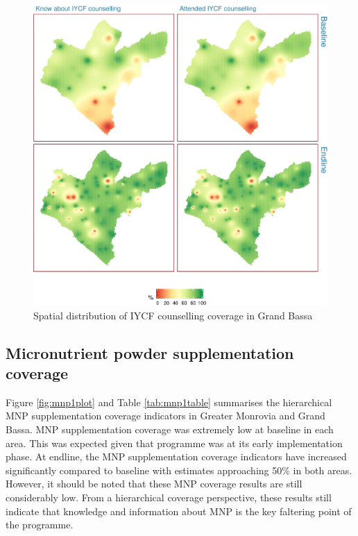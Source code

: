 \documentclass[12pt,a4paper]{article}
\begin{document}
\begin{figure}[H]

{\centering \includegraphics[width=0.65\linewidth]{liberiaCoverageFinalReport_files/figure-latex/icf2map-1} 

}

\caption{Spatial distribution of IYCF counselling coverage in Grand Bassa}\label{fig:icf2map}
\end{figure}

\newpage

\hypertarget{micronutrient-powder-supplementation-coverage}{%
\subsection{Micronutrient powder supplementation coverage}\label{micronutrient-powder-supplementation-coverage}}

Figure \ref{fig:mnp1plot} and Table \ref{tab:mnp1table} summarises the hierarchical MNP supplementation coverage indicators in Greater Monrovia and Grand Bassa. MNP supplementation coverage was extremely low at baseline in each area. This was expected given that programme was at its early implementation phase. At endline, the MNP supplementation coverage indicators have increased significantly compared to baseline with estimates approaching 50\% in both areas. However, it should be noted that these MNP coverage results are still considerably low. From a hierarchical coverage perspective, these results still indicate that knowledge and information about MNP is the key faltering point of the programme.
\end{document}
